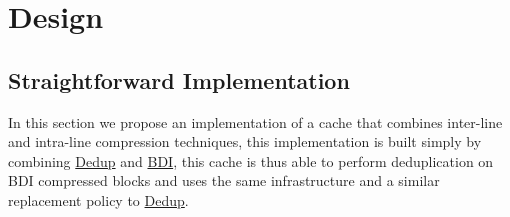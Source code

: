 
\chapter{Design}
\label{ch:Design}

\section{Straightforward Implementation}
\label{sec:Straightforward Implementation}
In this section we propose an implementation of a cache that combines inter-line and intra-line compression techniques, this implementation is built simply by combining \hyperref[sec:Dedup]{Dedup} and \hyperref[sec:BDI]{BDI}, this cache is thus able to perform deduplication on BDI compressed blocks and uses the same infrastructure and a similar replacement policy to \hyperref[sec:Dedup]{Dedup}.

